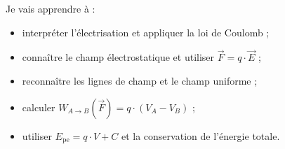 \documentclass[11pt,a4paper]{article}
\newcommand{\vect}[1]{\overrightarrow{#1}}
\newcommand{\Epe}{E_{\mathrm{pe}}}
\newcommand{\W}[2]{W_{#1\rightarrow #2}(\vect{F})}
\begin{document}
\begin{minipage}[t]{0.485\linewidth}\RaggedRight\vspace{0pt}
\begin{tcolorbox}[enhanced,colback=cBlue!5,colframe=cBlue!5,arc=3mm,left=4mm,right=4mm,top=3mm,bottom=3mm,
  title={\sffamily\bfseries\color{cBlue}Objectifs du chapitre},detach title,before upper={\tcbtitle\par\smallskip},fontupper=\small\RaggedRight]
Je vais apprendre à :
\begin{itemize}
  \item interpréter l’électrisation et appliquer la loi de Coulomb ;
  \item connaître le champ électrostatique et utiliser $\vect{F} = q\cdot\vect{E}$ ;
  \item reconnaître les lignes de champ et le champ uniforme ;
  \item calculer $\W{A}{B} = q\cdot(V_A - V_B)$ ;
  \item utiliser $\Epe = q\cdot V + C$ et la conservation de l’énergie totale.
\end{itemize}
\end{tcolorbox}
\end{minipage}\hfill
\end{document}
